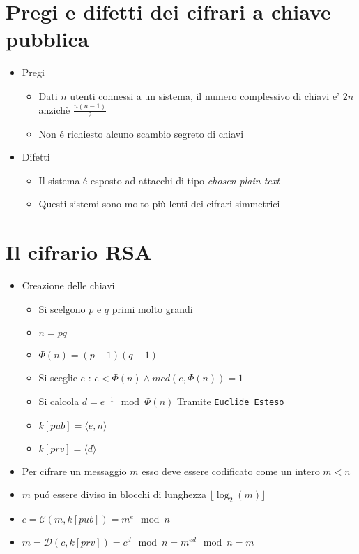 \section{Pregi e difetti dei cifrari a chiave pubblica}
\begin{itemize}
    \item Pregi
    \begin{itemize}
        \item Dati $n$ utenti connessi a un sistema, il numero complessivo di chiavi e' $2n$ anzich\`e $\frac{n(n-1)}{2}$
        \item Non \'e richiesto alcuno scambio segreto di chiavi
    \end{itemize}
    \item Difetti
    \begin{itemize}
        \item Il sistema \'e esposto ad attacchi di tipo \textit{chosen plain-text}
        \item Questi sistemi sono molto pi\`u lenti dei cifrari simmetrici
    \end{itemize}
\end{itemize}

\section{Il cifrario RSA}

\begin{itemize}
    \item Creazione delle chiavi
    \begin{itemize}
        \item Si scelgono $p$ e $q$ primi molto grandi
        \item $n = pq$
        \item $\Phi(n) = (p-1)(q-1)$
        \item Si sceglie $e$ : $e < \Phi(n) \wedge mcd(e, \Phi(n)) = 1$
        \item Si calcola $d = e^{-1} \mod{\Phi(n)}$ Tramite \texttt{Euclide Esteso}
        \item $k[pub] = \langle e, n \rangle$
        \item $k[prv] = \langle d \rangle$
    \end{itemize}
    \item Per cifrare un messaggio $m$ esso deve essere codificato come un intero $m < n$
    \item $m$ pu\'o essere diviso in blocchi di lunghezza $\lfloor \log_2(m) \rfloor$
    \item $c = \mathcal{C}(m, k[pub]) = m^e \mod{n}$
    \item $m = \mathcal{D}(c, k[prv]) = c^d \mod{n} = m^{ed} \mod{n} = m$
\end{itemize}

